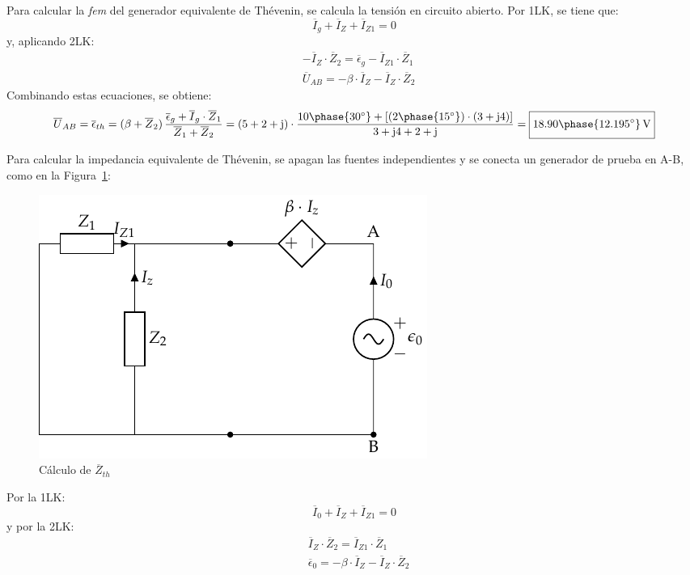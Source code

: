 \begin{example}
Para calcular la \textit{fem} del generador equivalente de Thévenin,
se calcula la tensión en circuito abierto. Por 1LK, se tiene que:
\begin{equation*}
  \overline{I}_g + \overline{I}_Z + \overline{I}_{Z1} = 0 
\end{equation*}
y, aplicando 2LK:
\begin{align*}
  &- \overline{I}_Z \cdot \overline{Z}_2 = \overline{\epsilon}_g - \overline{I}_{Z1} \cdot \overline{Z}_1\\
  &\overline{U}_{AB} = - \beta \cdot \overline{I}_Z - \overline{I}_Z \cdot \overline{Z}_2
\end{align*}
Combinando estas ecuaciones, se obtiene:
\begin{equation*}
  \overline{U}_{AB}=\overline{\epsilon}_{th} = (\beta + \overline{Z}_2) \, \dfrac{\overline{\epsilon}_g + \overline{I}_g \cdot \overline{Z}_1}{\overline{Z}_1 + \overline{Z}_2} = (5+2+\mathrm{j})\cdot\dfrac{10\phase{30^\circ}+[(2\phase{15^\circ})\cdot (3+\mathrm{j}4)]}{3 + \mathrm{j}4+2 + \mathrm{j}}= \boxed{\vphantom{\frac{a}{a}} 18.90\phase{12.195^\circ}\,\si{\volt}} 
\end{equation*}

Para calcular la impedancia equivalente de Thévenin, se apagan las
fuentes independientes y se conecta un generador de prueba en A-B,
como en la Figura~\ref{fig:thevenin6_zth}:
\begin{figure}[H]
  \centering
  \includegraphics[width=0.5\linewidth]{../figs/thevenin6_fuenteprueba.pdf}
  \caption{Cálculo de $\overline{Z}_{th}$}
  \label{fig:thevenin6_zth}
\end{figure}

Por la 1LK:
\begin{equation*}
  \overline{I}_0 + \overline{I}_Z + \overline{I}_{Z1} = 0
\end{equation*}
y por la 2LK:
\begin{align*}
  &\overline{I}_Z \cdot \overline{Z}_2 = \overline{I}_{Z1} \cdot \overline{Z}_1\\
  &\overline{\epsilon}_0 = - \beta \cdot \overline{I}_Z - \overline{I}_Z \cdot \overline{Z}_2
\end{align*}


\end{example}

